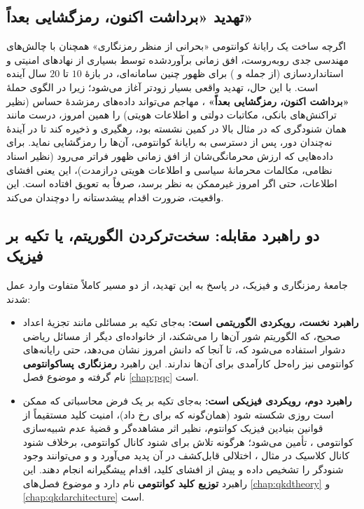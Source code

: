 \subsection{تهدید «برداشت اکنون، رمزگشایی بعداً»}

اگرچه ساخت یک رایانهٔ کوانتومی «بحرانی از منظر رمزنگاری»  همچنان با چالش‌های مهندسی جدی روبه‌روست، افق زمانی برآوردشده توسط بسیاری از نهادهای امنیتی و استانداردسازی (از جمله  و ) برای ظهور چنین سامانه‌ای، در بازهٔ $10$ تا $20$ سال آینده است. با این حال، تهدید واقعی بسیار زودتر آغاز می‌شود؛ زیرا در الگوی حملهٔ \textbf{«برداشت اکنون، رمزگشایی بعداً»} ، مهاجم می‌تواند داده‌های رمزشدهٔ حساس (نظیر تراکنش‌های بانکی، مکاتبات دولتی و اطلاعات هویتی) را همین امروز، درست مانند همان شنودگری که در مثال  بالا در کمین نشسته بود، رهگیری و ذخیره کند تا در آیندهٔ نه‌چندان دور، پس از دسترسی به رایانهٔ کوانتومی، آن‌ها را رمزگشایی نماید. برای داده‌هایی که ارزش محرمانگی‌شان از افق زمانی ظهور  فراتر می‌رود (نظیر اسناد نظامی، مکالمات محرمانهٔ سیاسی و اطلاعات هویتی درازمدت)، این یعنی افشای اطلاعات، حتی اگر امروز غیرممکن به نظر برسد، صرفاً به تعویق افتاده است. این واقعیت، ضرورت اقدام پیشدستانه را دوچندان می‌کند.

\subsection{دو راهبرد مقابله: سخت‌ترکردن الگوریتم، یا تکیه بر فیزیک}

جامعهٔ رمزنگاری و فیزیک، در پاسخ به این تهدید، از دو مسیر کاملاً متفاوت وارد عمل شدند:

\begin{itemize}
\item \textbf{راهبرد نخست، رویکردی الگوریتمی است:} به‌جای تکیه بر مسائلی مانند تجزیهٔ اعداد صحیح، که الگوریتم شور آن‌ها را می‌شکند، از خانواده‌ای دیگر از مسائل ریاضی دشوار استفاده می‌شود که، تا آنجا که دانش امروز نشان می‌دهد، حتی رایانه‌های کوانتومی نیز راه‌حل کارآمدی برای آن‌ها ندارند. این راهبرد \textbf{رمزنگاری پساکوانتومی}  نام گرفته و موضوع فصل \ref{chap:pqc} است.
\item \textbf{راهبرد دوم، رویکردی فیزیکی است:} به‌جای تکیه بر یک فرض محاسباتی که ممکن است روزی شکسته شود (همان‌گونه که برای  رخ داد)، امنیت کلید مستقیماً از قوانین بنیادین فیزیک کوانتوم، نظیر اثر مشاهده‌گر  و قضیهٔ عدم شبیه‌سازی کوانتومی ، تأمین می‌شود؛ هرگونه تلاش  برای شنود کانال کوانتومی، برخلاف شنود کانال کلاسیک در مثال ، اختلالی قابل‌کشف در آن پدید می‌آورد و  و  می‌توانند وجود شنودگر را تشخیص داده و پیش از افشای کلید، اقدام پیشگیرانه انجام دهند. این راهبرد \textbf{توزیع کلید کوانتومی}  نام دارد و موضوع فصل‌های \ref{chap:qkdtheory} و \ref{chap:qkdarchitecture} است.
\end{itemize}

